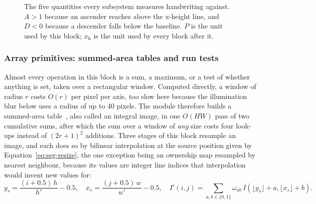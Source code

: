 \begin{figure}[h]
\centering
{}
\caption{The five quantities every subsystem measures handwriting against. $A>1$ because an ascender reaches above the x-height line, and $D<0$ because a descender falls below the baseline. $P$ is the unit used by this block; $x_{\mathrm h}$ is the unit used by every block after it.}
\label{fig:seg-geom}
\end{figure}

\subsubsection{Array primitives: summed-area tables and run tests}
\label{sec:seg-prims}

Almost every operation in this block is a sum, a maximum, or a test of whether anything is set, taken over a rectangular window. Computed directly, a window of radius $r$ costs $O(r)$ per pixel per axis, too slow here because the illumination blur below uses a radius of up to 40 pixels. The module therefore builds a summed-area table~\cite{crow1984}, also called an integral image, in one $O(HW)$ pass of two cumulative sums, after which the sum over a window of \emph{any} size costs four look-ups instead of $(2r+1)^2$ additions. Three stages of this block resample an image, and each does so by bilinear interpolation at the source position given by Equation~\ref{eq:seg-resize}, the one exception being an ownership map resampled by nearest neighbour, because its values are integer line indices that interpolation would invent new values for:
\begin{equation}
y_s=\frac{(i+0.5)\,h}{h'}-0.5,\quad x_s=\frac{(j+0.5)\,w}{w'}-0.5,\quad I'(i,j)=\sum_{a,b\in\{0,1\}}\omega_{ab}\,I(\lfloor y_s\rfloor+a,\lfloor x_s\rfloor+b).
\label{eq:seg-resize}
\end{equation}

